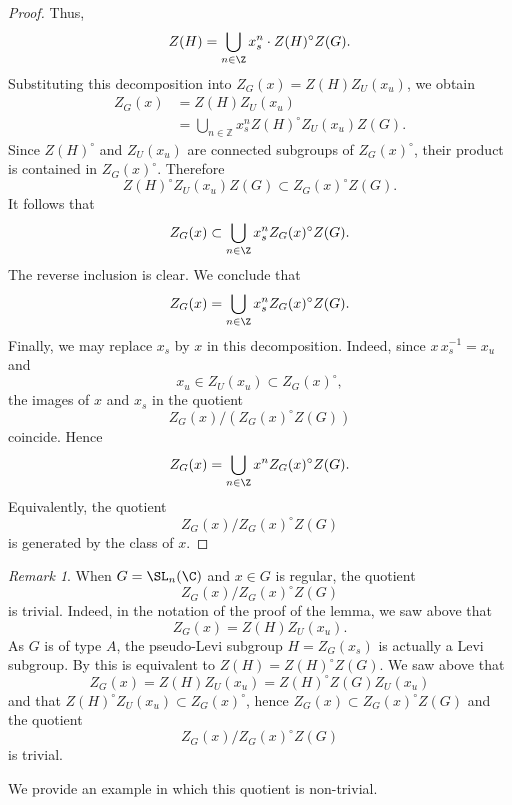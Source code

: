 \documentclass[12pt, a4paper, oneside]{amsart}
\theoremstyle{plain} %
\theoremstyle{definition} %
\theoremstyle{remark} %
\newtheorem{remark}[theorem]{Remark}
\begin{document}
\begin{proof}
Thus,
\[Z(H)=\bigcup_{n\in\Z}x_{s}^{n} \cdot Z(H)^\circ Z(G).\]
Substituting this decomposition into $Z_G(x)=Z(H)Z_U(x_u)$, we obtain
\[\begin{aligned}
        Z_G(x)
        &=Z(H)Z_U(x_u) \\
        &= \bigcup_{n\in\mathbb Z} x_s^n Z(H)^\circ Z_{U}(x_u)Z(G).
\end{aligned}\]
Since $Z(H)^\circ$ and $Z_{U}(x_u)$ are connected subgroups of $Z_{G}(x)^\circ$, their product is contained in $Z_G(x)^\circ$. Therefore
\[Z(H)^\circ Z_{U}(x_u) Z(G)\subset Z_{G}(x)^\circ Z(G).\]
It follows that
\[Z_G(x)\subset \bigcup_{ n\in\Z}x_s^{n} Z_{G}(x)^\circ Z(G).\]
The reverse inclusion is clear. We conclude that
\[Z_G(x)=\bigcup_{ n\in\Z}x_s^{n}Z_G(x)^\circ Z(G).\]
Finally, we may replace $x_s$ by $x$ in this decomposition. Indeed, since $x\,x_s^{-1}=x_u$ and
\[x_{u}\in Z_{U}(x_{u})\subset Z_{G}(x)^\circ,\]
the images of $x$ and $x_{s}$ in the quotient
\[Z_{G}(x)/(Z_{G}(x)^\circ Z(G))\]
coincide. Hence
\[Z_G(x)=\bigcup_{ n\in\Z}x^n Z_G(x)^\circ Z(G).\]
Equivalently, the quotient
\[Z_G(x)/Z_G(x)^\circ Z(G)\]
is generated by the class of $x$.
\end{proof}
\begin{remark}
When $G=\SL_n(\C)$ and $x\in G$ is regular, the quotient 
\[Z_G(x)/Z_G(x)^\circ Z(G)\]
is trivial. Indeed, in the notation of the proof of the lemma, we saw above that 
\[Z_G(x) = Z(H) Z_U(x_u).\]
As $G$ is of type $A$, the pseudo-Levi subgroup $H = Z_G(x_s)$ is actually a Levi subgroup. By \cite[Proposition 3.5]{CE12} this is equivalent to $Z(H)=Z(H)^\circ Z(G)$. We saw above that 
\[Z_G(x) = Z(H)Z_U(x_u) = Z(H)^\circ Z(G)Z_U(x_u)\]
and that $Z(H)^\circ Z_U(x_u)\subset Z_G(x)^\circ$, hence $Z_G(x)\subset Z_G(x)^\circ Z(G)$ and the quotient \[Z_G(x)/Z_G(x)^\circ Z(G)\]
is trivial.
\end{remark}
We provide an example in which this quotient is non-trivial.
\end{document}
